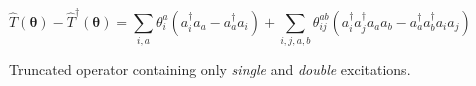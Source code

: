 \begin{figure}[H]
    \centering
    \begin{equation*}
    \hat T(\bm{\theta}) - \hat T^{\dagger}(\bm{\theta}) =
    \sum_{i, a} \theta^a_i (a^\dagger_i a_a - a^\dagger_a a_i) + 
    \sum_{i, j, a, b} \theta^{ab}_{ij} (a^\dagger_i a^\dagger_j a_a a_b - a^\dagger_a a^\dagger_b a_i a_j)
    \end{equation*}
    \caption{Truncated operator containing only \textit{single} and \textit{double} excitations.}
\end{figure}
